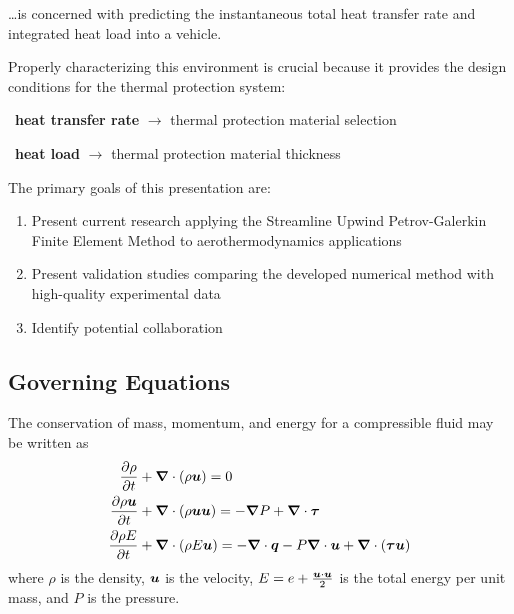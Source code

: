 \documentclass[compress,11pt]{beamer}
\begin{document}
{  \ldots is concerned with predicting the instantaneous total heat transfer rate and integrated heat load into a vehicle.
  \vspace{1em}

  Properly characterizing this environment is crucial because it provides the design conditions for the thermal protection system:
  \vspace{1em}
  
  \mbox{  }\textbf{heat transfer rate} $\rightarrow$ thermal protection material selection
  
  \mbox{  }\textbf{heat load} $\rightarrow$ thermal protection material thickness
}

\frame
{
  The primary goals of this presentation are:
  \vspace{.5em}
  
  \begin{enumerate}
    \item Present current research applying the Streamline Upwind Petrov-Galerkin Finite Element Method to aerothermodynamics applications
    \item Present validation studies comparing the developed numerical method with high-quality experimental data
    \item Identify potential collaboration 
  \end{enumerate}
}

\subsection{Governing Equations}
\frame
{
  The conservation of mass, momentum, and energy for a compressible fluid may be written as
  \begin{align}
    \label{eq:pde_comp_mass}
    {\frac{\partial{\rho}}{\partial{t}}} &+ {\boldsymbol{\nabla}} {}\cdot \left(\rho{\boldsymbol{u}}\right) = 0 \\
    \label{eq:pde_comp_mom}
    {\frac{\partial{\rho{\boldsymbol{u}}}}{\partial{t}}} &+ {\boldsymbol{\nabla}} {}\cdot\left(\rho{\boldsymbol{u}}{\boldsymbol{u}}\right) =
    -{\boldsymbol{\nabla}} {P} + {\boldsymbol{\nabla}} {}\cdot{\boldsymbol{\tau}} \\
    \label{eq:pde_comp_energy}
    {\frac{\partial{\rho E}}{\partial{t}}} &+ {\boldsymbol{\nabla}} {}\cdot\left(\rho E {\boldsymbol{u}}\right) =
    -{\boldsymbol{\nabla}} {}\cdot{\boldsymbol{q}} - P{\boldsymbol{\nabla}} {}\cdot{\boldsymbol{u}} + {\boldsymbol{\nabla}} {}\cdot\left({\boldsymbol{\tau}}{\boldsymbol{u}}\right)  
  \end{align}
  where $\rho$ is the density, ${\boldsymbol{u}}$ is the velocity, $E=e + \frac{{\boldsymbol{u}}\cdot{\boldsymbol{u}}}{2}$ is the total energy per unit mass, and $P$ is the pressure.
}
\end{document}
